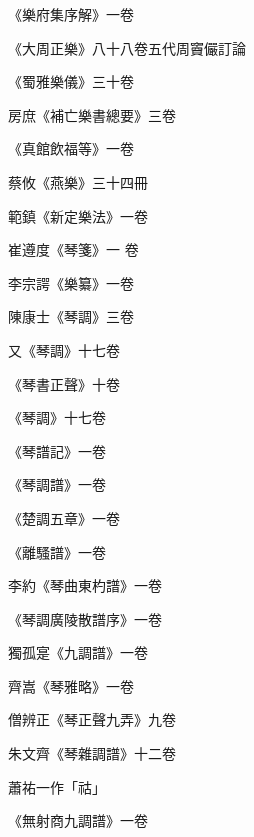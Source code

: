 \begin{pinyinscope}
 《樂府集序解》一卷



 《大周正樂》八十八卷五代周竇儼訂論



 《蜀雅樂儀》三十卷



 房庶《補亡樂書總要》三卷



 《真館飲福等》一卷



 蔡攸《燕樂》三十四冊



 範鎮《新定樂法》一卷



 崔遵度《琴箋》一
 卷



 李宗諤《樂纂》一卷



 陳康士《琴調》三卷



 又《琴調》十七卷



 《琴書正聲》十卷



 《琴調》十七卷



 《琴譜記》一卷



 《琴調譜》一卷



 《楚調五章》一卷



 《離騷譜》一卷



 李約《琴曲東杓譜》一卷



 《琴調廣陵散譜序》一卷



 獨孤寔《九調譜》一卷



 齊嵩《琴雅略》一卷



 僧辨正《琴正聲九弄》九卷



 朱文齊《琴雜調譜》十二卷



 蕭祐一作「祜」



 《無射商九調譜》一卷




\end{pinyinscope}
